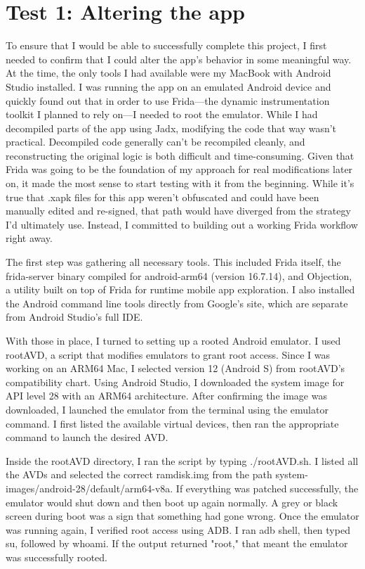\section{Test 1: Altering the app}
To ensure that I would be able to successfully complete this project, I first needed to confirm that I could alter the app’s behavior in some meaningful way. At the time, the only tools I had available were my MacBook with Android Studio installed. I was running the app on an emulated Android device and quickly found out that in order to use Frida—the dynamic instrumentation toolkit I planned to rely on—I needed to root the emulator. While I had decompiled parts of the app using Jadx, modifying the code that way wasn’t practical. Decompiled code generally can’t be recompiled cleanly, and reconstructing the original logic is both difficult and time-consuming.
Given that Frida was going to be the foundation of my approach for real modifications later on, it made the most sense to start testing with it from the beginning. While it’s true that .xapk files for this app weren’t obfuscated and could have been manually edited and re-signed, that path would have diverged from the strategy I’d ultimately use. Instead, I committed to building out a working Frida workflow right away.

The first step was gathering all necessary tools. This included Frida itself, the frida-server binary compiled for android-arm64 (version 16.7.14), and Objection, a utility built on top of Frida for runtime mobile app exploration. I also installed the Android command line tools directly from Google’s site, which are separate from Android Studio’s full IDE.

With those in place, I turned to setting up a rooted Android emulator. I used rootAVD, a script that modifies emulators to grant root access. Since I was working on an ARM64 Mac, I selected version 12 (Android S) from rootAVD’s compatibility chart. Using Android Studio, I downloaded the system image for API level 28 with an ARM64 architecture. After confirming the image was downloaded, I launched the emulator from the terminal using the emulator command. I first listed the available virtual devices, then ran the appropriate command to launch the desired AVD.

Inside the rootAVD directory, I ran the script by typing ./rootAVD.sh. I listed all the AVDs and selected the correct ramdisk.img from the path system-images/android-28/default/arm64-v8a. If everything was patched successfully, the emulator would shut down and then boot up again normally. A grey or black screen during boot was a sign that something had gone wrong. Once the emulator was running again, I verified root access using ADB. I ran adb shell, then typed su, followed by whoami. If the output returned "root," that meant the emulator was successfully rooted.


